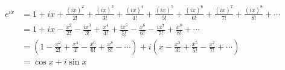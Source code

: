 \documentclass[12pt,a4paper]{letter}
\begin{document}
\begin{align}
 e^{ix} &{}= 1 + ix + \frac{(ix)^2}{2!} + \frac{(ix)^3}{3!} + \frac{(ix)^4}{4!} + \frac{(ix)^5}{5!} + \frac{(ix)^6}{6!} + \frac{(ix)^7}{7!} + \frac{(ix)^8}{8!} + \cdots \\[8pt]
        &{}= 1 + ix - \frac{x^2}{2!} - \frac{ix^3}{3!} + \frac{x^4}{4!} + \frac{ix^5}{5!} - \frac{x^6}{6!} - \frac{ix^7}{7!} + \frac{x^8}{8!} + \cdots \\[8pt]
        &{}= \left( 1 - \frac{x^2}{2!} + \frac{x^4}{4!} - \frac{x^6}{6!} + \frac{x^8}{8!} - \cdots \right) + i\left( x - \frac{x^3}{3!} + \frac{x^5}{5!} - \frac{x^7}{7!} + \cdots \right) \\[8pt]
        &{}= \cos x + i\sin x 
\end{align}
\end{document}
